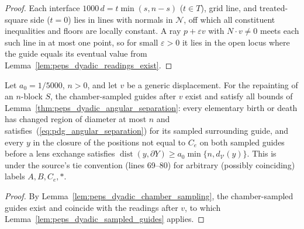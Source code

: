 \begin{proof}\leanok
    Each interface $1000\,d=t\min(s,n-s)$ ($t\in T$), grid line, and treated-square
    side ($t=0$) lies in lines with normals in $\mathcal N$, off which all
    constituent inequalities and floors are locally constant. A ray
    $p+\varepsilon v$ with $N\cdot v\ne0$ meets each such line in at most one
    point, so for small $\varepsilon>0$ it lies in the open locus where the guide
    equals its eventual value from Lemma~\ref{lem:peps_dyadic_readings_exist}.
\end{proof}

\begin{theorem}
    \label{thm:peps_dyadic_angular_separation_sampled}
    \leanok
    Let $a_0=1/5000$, $n>0$, and let $v$ be a generic displacement. For the
    repainting of an $n$-block $S$, the chamber-sampled guides after $v$ exist and
    satisfy all bounds of Lemma~\ref{thm:peps_dyadic_angular_separation}: every
    elementary birth or death has changed region of diameter at most $n$ and
    satisfies~(\ref{eq:pdg_angular_separation}) for its sampled surrounding guide,
    and every $y$ in the closure of the positions not equal to $C_e$ on both
    sampled guides before a lens exchange satisfies
    $\operatorname{dist}(y,\partial Y)\ge a_0\min\{n,d_{\mathcal V}(y)\}$. This
    is~\cite[Lemma~7.2]{OpenAI2026PolynomialPEPS} under the source's tie convention
    (lines 69--80) for arbitrary (possibly coinciding) labels $A,B,C_e,\ast$.
\end{theorem}

\begin{proof}\leanok
    By Lemma~\ref{lem:peps_dyadic_chamber_sampling}, the chamber-sampled guides
    exist and coincide with the readings after $v$, to which
    Lemma~\ref{lem:peps_dyadic_sampled_guides} applies.
\end{proof}

